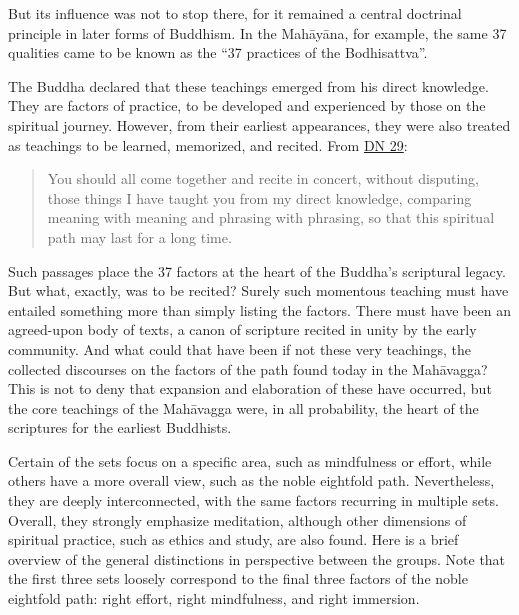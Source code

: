 \documentclass[12pt,openany]{book}%
\begin{document}
But its influence was not to stop there, for it remained a central doctrinal principle in later forms of Buddhism. In the \textsanskrit{Mahāyāna}, for example, the same 37 qualities came to be known as the “37 practices of the Bodhisattva”.

The Buddha declared that these teachings emerged from his direct knowledge. They are factors of practice, to be developed and experienced by those on the spiritual journey. However, from their earliest appearances, they were also treated as teachings to be learned, memorized, and recited. From \href{https://suttacentral.net/dn29}{DN 29}:

\begin{quotation}%
You should all come together and recite in concert, without disputing, those things I have taught you from my direct knowledge, comparing meaning with meaning and phrasing with phrasing, so that this spiritual path may last for a long time.

%
\end{quotation}

Such passages place the 37 factors at the heart of the Buddha’s scriptural legacy. But what, exactly, was to be recited? Surely such momentous teaching must have entailed something more than simply listing the factors. There must have been an agreed-upon body of texts, a canon of scripture recited in unity by the early community. And what could that have been if not these very teachings, the collected discourses on the factors of the path found today in the \textsanskrit{Mahāvagga}? This is not to deny that expansion and elaboration of these have occurred, but the core teachings of the \textsanskrit{Mahāvagga} were, in all probability, the heart of the scriptures for the earliest Buddhists.

Certain of the sets focus on a specific area, such as mindfulness or effort, while others have a more overall view, such as the noble eightfold path. Nevertheless, they are deeply interconnected, with the same factors recurring in multiple sets. Overall, they strongly emphasize meditation, although other dimensions of spiritual practice, such as ethics and study, are also found. Here is a brief overview of the general distinctions in perspective between the groups. Note that the first three sets loosely correspond to the final three factors of the noble eightfold path: right effort, right mindfulness, and right immersion.
\end{document}
